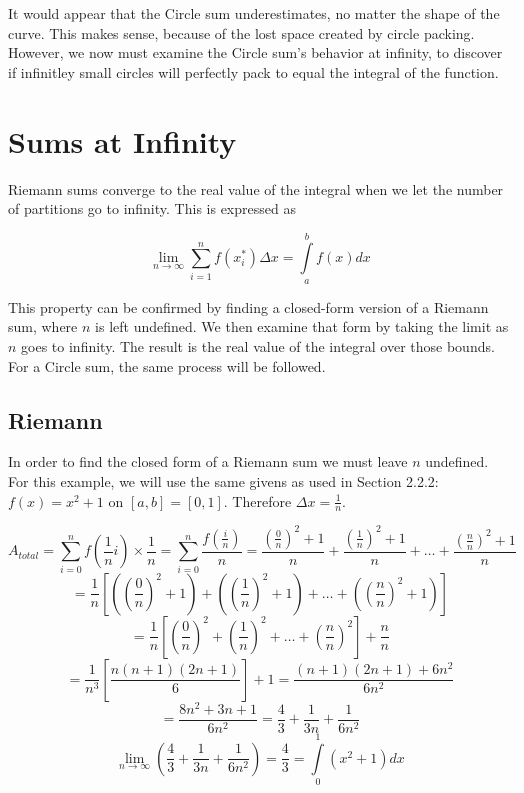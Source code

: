 \documentclass{article}
\begin{document}
    It would appear that the Circle sum underestimates, no matter the shape of the curve. This makes sense, because of the lost space created by circle packing. However, we now must examine the Circle sum's behavior at infinity, to discover if infinitley small circles will perfectly pack to equal the integral of the function.

  \section{Sums at Infinity}
    Riemann sums converge to the real value of the integral when we let the number of partitions go to infinity. This is expressed as

    \[ \displaystyle\lim_{n \to \infty}\sum_{i=1}^{n} f(x^*_i) \Delta x = \int\limits_a^b f(x)dx \]

    This property can be confirmed by finding a closed-form version of a Riemann sum, where \( n \) is left undefined. We then examine that form by taking the limit as \( n \) goes to infinity. The result is the real value of the integral over those bounds. For a Circle sum, the same process will be followed.

    \subsection{Riemann}
      In order to find the closed form of a Riemann sum we must leave \( n \) undefined. For this example, we will use the same givens as used in Section 2.2.2: \( f(x) = x^2 + 1 \) on \( [a,b] = [0,1] \). Therefore \( \Delta x = \frac{1}{n} \).

      \[ A_{total} = \displaystyle\sum_{i=0}^n f(\frac{1}{n}i)\times\frac{1}{n} = \sum_{i=0}^n \frac{f(\frac{i}{n})}{n} = \frac{(\frac{0}{n})^2+1}{n} + \frac{(\frac{1}{n})^2+1}{n} + \dots + \frac{(\frac{n}{n})^2+1}{n} \]
      \[ = \frac{1}{n}\left[ \left( \left(\frac{0}{n}\right)^2 + 1 \right) + \left( \left(\frac{1}{n}\right)^2 + 1 \right) + \dots + \left( \left(\frac{n}{n}\right)^2 + 1 \right) \right] \]
      \[ = \frac{1}{n}\left[ \left( \frac{0}{n} \right)^2 + \left( \frac{1}{n} \right)^2 + \dots + \left( \frac{n}{n} \right)^2 \right] + \frac{n}{n} \]
      \[ = \frac{1}{n^3}\left[ \frac{n(n+1)(2n+1)}{6} \right] + 1 = \frac{(n+1)(2n+1) + 6n^2}{6n^2} \]
      \[ = \frac{8n^2+3n+1}{6n^2} = \frac{4}{3} + \frac{1}{3n} + \frac{1}{6n^2} \]
      \[ \displaystyle\lim_{n \to \infty}\left(\frac{4}{3} + \frac{1}{3n} + \frac{1}{6n^2} \right) = \frac{4}{3} = \int\limits_0^1 (x^2+1)dx \]
\end{document}
